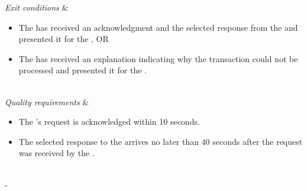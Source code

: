\begin{table}[H]
\begin{tabu}
	\textit{Exit conditions} &
	\vspace{-3mm}
	\begin{itemize}[leftmargin=*,topsep=0pt,itemsep=-1ex]
		\item The \client has received an acknowledgment and the selected response from the \server and presented it for the \researcher, OR
		\item The \client has received an explanation indicating why the transaction could not be processed and presented it for the \researcher.
	\end{itemize} \\
	\hline
	\textit{Quality \newline requirements} &
	\vspace{-3mm}
	\begin{itemize}[leftmargin=*,topsep=0pt,itemsep=-1ex]
		\item The \researcher's request is acknowledged within 10 seconds.
		\item The selected response to the \client arrives no later than 40 seconds after the request was received by the \server.
	\end{itemize} \\
	\tabucline[1.5pt]-
\end{tabu}
\caption{Use case: ExportProtocol}
\label{uc:ExportProtocol}
\end{table}